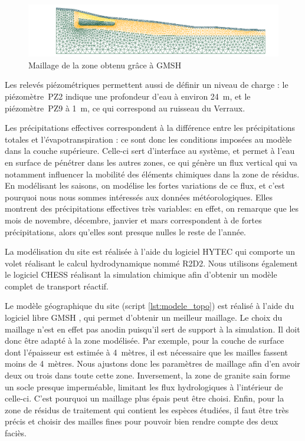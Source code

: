 \documentclass{article}
\newcommand{\blue}[1]{\textcolor{blue}{#1}} %
\begin{document}
\begin{figure}[H]
    \centering
    \includegraphics[width=1.0\linewidth]{III_B_3_4.png}
    \caption{Maillage de la zone obtenu grâce à GMSH}
    \label{maillage_ribiere}
\end{figure}

Les relevés piézométriques permettent aussi de définir un niveau de charge : le piézomètre~PZ2 indique une profondeur d’eau à environ 24~m, et le piézomètre~PZ9 à 1~m, ce qui correspond au ruisseau du Verraux.

Les précipitations effectives correspondent à la différence entre les précipitations totales et l'évapotranspiration : ce sont donc les conditions imposées au modèle dans la couche supérieure. Celle-ci sert d'interface au système, et permet à l'eau en surface de pénétrer dans les autres zones, ce qui génère un flux vertical qui va notamment influencer la mobilité des éléments chimiques dans la zone de résidus. En modélisant les saisons, on modélise les fortes variations de ce flux, et c'est pourquoi nous nous sommes intéressés aux données météorologiques. Elles montrent des précipitations effectives très variables: en effet, on remarque que les mois de novembre, décembre, janvier et mars correspondent à de fortes précipitations, alors qu’elles sont presque nulles le reste de l’année.

La modélisation du site est réalisée à l'aide du logiciel HYTEC qui comporte un volet réalisant le calcul hydrodynamique nommé R2D2. Nous utilisons également le logiciel CHESS réalisant la simulation chimique \cite{van_der_lee_module-oriented_2003} afin d'obtenir un modèle complet de transport réactif.

Le modèle géographique du site (script \ref{lst:modele_topo}) est réalisé à l'aide du logiciel libre GMSH \cite{geuzaine_gmsh}, qui permet d'obtenir un meilleur maillage. Le choix du maillage n'est en effet pas anodin puisqu'il sert de support à la simulation. Il doit donc être adapté à la zone modélisée. Par exemple, pour la couche de surface dont l'épaisseur est estimée à 4~mètres, il est nécessaire que les mailles fassent moins de 4~mètres. Nous ajustons donc les paramètres de maillage afin d'en avoir deux ou trois dans toute cette zone. Inversement, la zone de granite sain forme un socle presque imperméable, limitant les flux hydrologiques à l'intérieur de celle-ci. C'est pourquoi un maillage plus épais peut être choisi. Enfin, pour la zone de résidus de traitement qui contient les espèces étudiées, il faut être très précis et choisir des mailles fines pour pouvoir bien rendre compte des deux faciès.
\end{document}
